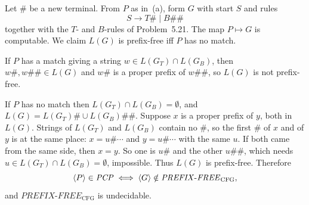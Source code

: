 \begin{soln}
Let $\#$ be a new terminal. From $P$ as in~(a), form $G$ with start $S$ and rules
\[
S\to T\#\mid B\#\#
\]
together with the $T$- and $B$-rules of Problem~5.21. The map $P\mapsto G$ is computable. We claim $L(G)$ is prefix-free iff $P$ has no match.

If $P$ has a match giving a string $w\in L(G_T)\cap L(G_B)$, then $w\#,w\#\#\in L(G)$ and $w\#$ is a proper prefix of $w\#\#$, so $L(G)$ is not prefix-free.

If $P$ has no match then $L(G_T)\cap L(G_B)=\emptyset$, and $L(G)=L(G_T)\#\cup L(G_B)\#\#$. Suppose $x$ is a proper prefix of $y$, both in $L(G)$. Strings of $L(G_T)$ and $L(G_B)$ contain no $\#$, so the first $\#$ of $x$ and of $y$ is at the same place: $x=u\#\cdots$ and $y=u\#\cdots$ with the same $u$. If both came from the same side, then $x=y$. So one is $u\#$ and the other $u\#\#$, which needs $u\in L(G_T)\cap L(G_B)=\emptyset$, impossible. Thus $L(G)$ is prefix-free. Therefore
\[
\langle P\rangle\in\mathit{PCP} \iff \langle G\rangle\notin\mathit{PREFIX\text{-}FREE}_{\mathrm{CFG}},
\]
and $\mathit{PREFIX\text{-}FREE}_{\mathrm{CFG}}$ is undecidable.
\end{soln}

